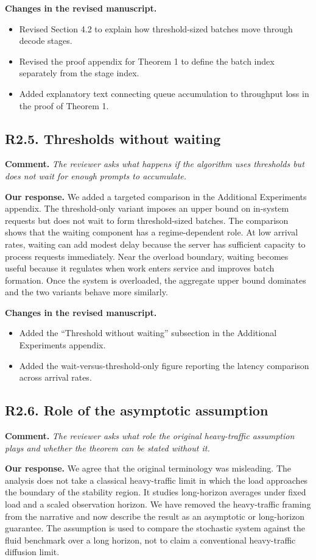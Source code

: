 \documentclass[11pt]{article}
\newcommand{\comment}[1]{%
  \vspace{0.25em}
  \noindent\textbf{Comment.} \emph{#1}
}
\newcommand{\response}{\vspace{0.25em}\noindent\textbf{Our response.} }
\newcommand{\changes}{\vspace{0.25em}\noindent\textbf{Changes in the revised manuscript.} }
\begin{document}
\changes
\begin{itemize}
    \item Revised Section 4.2 to explain how threshold-sized batches move through decode stages.
    \item Revised the proof appendix for Theorem 1 to define the batch index separately from the stage index.
    \item Added explanatory text connecting queue accumulation to throughput loss in the proof of Theorem 1.
\end{itemize}

\subsection*{R2.5. Thresholds without waiting}

\comment{The reviewer asks what happens if the algorithm uses thresholds but does not wait for enough prompts to accumulate.}

\response We added a targeted comparison in the Additional Experiments appendix. The threshold-only variant imposes an upper bound on in-system requests but does not wait to form threshold-sized batches. The comparison shows that the waiting component has a regime-dependent role. At low arrival rates, waiting can add modest delay because the server has sufficient capacity to process requests immediately. Near the overload boundary, waiting becomes useful because it regulates when work enters service and improves batch formation. Once the system is overloaded, the aggregate upper bound dominates and the two variants behave more similarly.

\changes
\begin{itemize}
    \item Added the ``Threshold without waiting'' subsection in the Additional Experiments appendix.
    \item Added the wait-versus-threshold-only figure reporting the latency comparison across arrival rates.
\end{itemize}

\subsection*{R2.6. Role of the asymptotic assumption}

\comment{The reviewer asks what role the original heavy-traffic assumption plays and whether the theorem can be stated without it.}

\response We agree that the original terminology was misleading. The analysis does not take a classical heavy-traffic limit in which the load approaches the boundary of the stability region. It studies long-horizon averages under fixed load and a scaled observation horizon. We have removed the heavy-traffic framing from the narrative and now describe the result as an asymptotic or long-horizon guarantee. The assumption is used to compare the stochastic system against the fluid benchmark over a long horizon, not to claim a conventional heavy-traffic diffusion limit.
\end{document}
